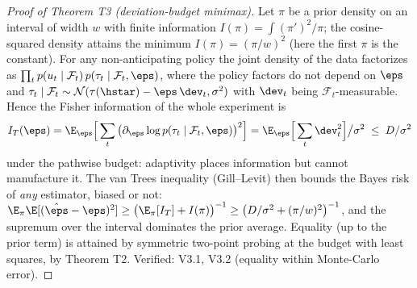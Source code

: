\documentclass[11pt]{article}
\begin{document}
\begin{proof}[Proof of Theorem T3 (deviation-budget minimax)]
Let $\pi$ be a prior density on an interval of width $w$ with finite
information $I(\pi) = \int (\pi')^2/\pi$; the cosine-squared density
attains the minimum $I(\pi) = (\pi/w)^2$ (here the first $\pi$ is the
constant). For any non-anticipating policy the joint density of the data
factorizes as
$\prod_t p(u_t \mid \mathcal{F}_t)\, p(\tau_t \mid \mathcal{F}_t, \eps)$,
where the policy factors do not depend on $\eps$ and
$\tau_t \mid \mathcal{F}_t \sim \mathcal{N}(\tau(\hstar) - \eps\,\dev_t,
\sigma^2)$ with $\dev_t$ being $\mathcal{F}_t$-measurable. Hence the Fisher
information of the whole experiment is
\[
I_T(\eps) = \E_\eps\Big[\sum_t \big(\partial_\eps \log
p(\tau_t \mid \mathcal{F}_t, \eps)\big)^2\Big]
 = \E_\eps\Big[\sum_t \dev_t^2\Big]\big/\sigma^2 \;\le\; D/\sigma^2
\]
under the pathwise budget: adaptivity places information but cannot
manufacture it. The van Trees inequality (Gill--Levit) then bounds the
Bayes risk of \emph{any} estimator, biased or not:
$\E_\pi \E[(\hat\eps - \eps)^2] \ge \big(\E_\pi[I_T] + I(\pi)\big)^{-1}
\ge \big(D/\sigma^2 + (\pi/w)^2\big)^{-1}$, and the supremum over the
interval dominates the prior average. Equality (up to the prior term) is
attained by symmetric two-point probing at the budget with least squares,
by Theorem T2. Verified: V3.1, V3.2 (equality within Monte-Carlo error).
\end{proof}
\end{document}
